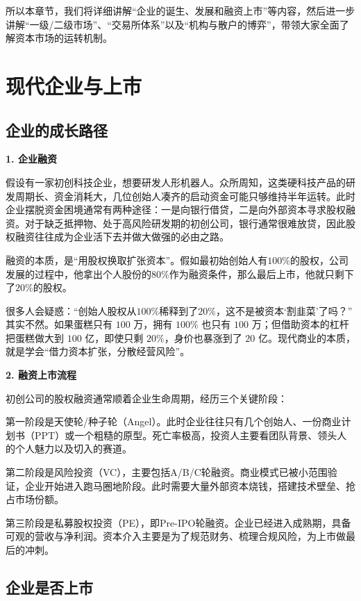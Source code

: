 \documentclass[12pt,openany]{book}
\newcommand{\subhead}[1]{%
    \par\vspace{0.5\baselineskip}%
    \noindent\textbf{#1}\par%
    \vspace{0.5\baselineskip}%
}
\begin{document}
所以本章节，我们将详细讲解“企业的诞生、发展和融资上市”等内容，然后进一步讲解“一级/二级市场”、“交易所体系”以及“机构与散户的博弈”，带领大家全面了解资本市场的运转机制。

\section{现代企业与上市}

\subsection{企业的成长路径}

\subhead{1. 企业融资}

假设有一家初创科技企业，想要研发人形机器人。众所周知，这类硬科技产品的研发周期长、资金消耗大，几位创始人凑齐的启动资金可能只够维持半年运转。此时企业摆脱资金困境通常有两种途径：一是向银行借贷，二是向外部资本寻求股权融资。对于缺乏抵押物、处于高风险研发期的初创公司，银行通常很难放贷，因此股权融资往往成为企业活下去并做大做强的必由之路。

融资的本质，是“用股权换取扩张资本”。假如最初始创始人有$100\%$的股权，公司发展的过程中，他拿出个人股份的$80\%$作为融资条件，那么最后上市，他就只剩下了$20\%$的股权。

很多人会疑惑：“创始人股权从$100\%$稀释到了$20\%$，这不是被资本‘割韭菜’了吗？”
其实不然。如果蛋糕只有 $100$ 万，拥有 $100\%$ 也只有 $100$ 万；但借助资本的杠杆把蛋糕做大到 $100$ 亿，即使只剩 $20\%$，身价也暴涨到了 $20$ 亿。现代商业的本质，就是学会“借力资本扩张，分散经营风险”。

\subhead{2. 融资上市流程}

初创公司的股权融资通常顺着企业生命周期，经历三个关键阶段：

第一阶段是天使轮/种子轮（Angel）。此时企业往往只有几个创始人、一份商业计划书（PPT）或一个粗糙的原型。死亡率极高，投资人主要看团队背景、领头人的个人魅力以及切入的赛道。

第二阶段是风险投资（VC），主要包括A/B/C轮融资。商业模式已被小范围验证，企业开始进入跑马圈地阶段。此时需要大量外部资本烧钱，搭建技术壁垒、抢占市场份额。

第三阶段是私募股权投资（PE），即Pre-IPO轮融资。企业已经进入成熟期，具备可观的营收与净利润。资本介入主要是为了规范财务、梳理合规风险，为上市做最后的冲刺。

\subsection{企业是否上市}
\end{document}
